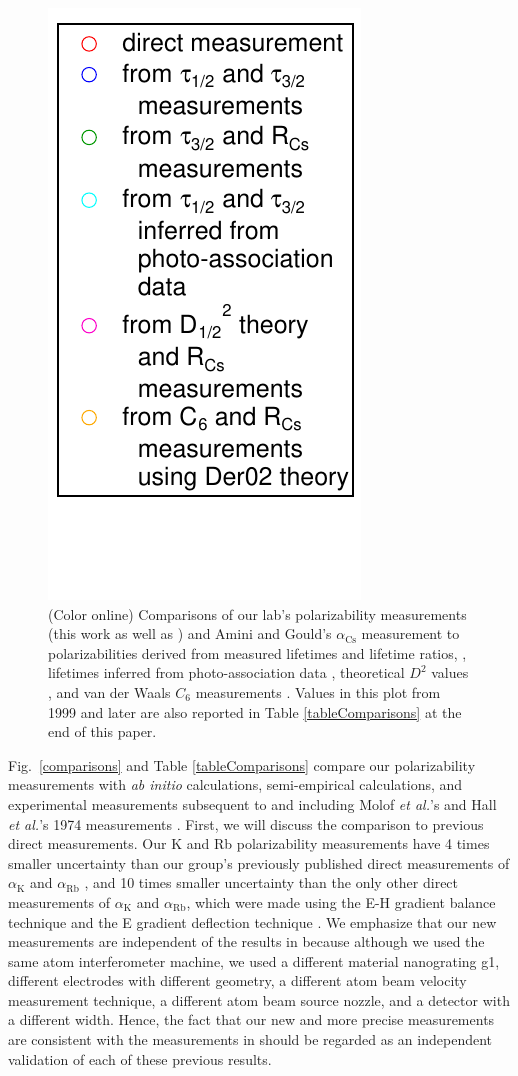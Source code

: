 \documentclass[twocolumn,pra,showpacs,superscriptaddress,longbibliography]{revtex4-1}   %
\newcommand{\figref}[1]{Fig.~\ref{#1}}
\newcommand{\ak}{\alpha_{\textrm{K}}}
\newcommand{\arb}{\alpha_{\textrm{Rb}}}
\newcommand{\acs}{\alpha_{\textrm{Cs}}}
\newcommand{\etal}{\textit{et al.}}
\begin{document}
\begin{figure}
\includegraphics[width=0.365\linewidth,keepaspectratio,valign=t]{displayMiscLegend.pdf}
\caption{\label{comparisonsMisc}(Color online) Comparisons of our lab's polarizability measurements (this work as well as \cite{Holmgren2010}) and Amini and Gould's $\acs$ measurement \cite{Amini2003} to polarizabilities derived from measured lifetimes and lifetime ratios,
\cite{Young1994,Volz2006,Wang1997,Simsarian1998,Rafac1999,Falke2006a,Bouloufa2007,Rafac1998}, 
lifetimes inferred from photo-association data
\cite{Gutterres2002,Gabbanini2000},
theoretical $D^2$ values
\cite{Porsev2010},
and van der Waals $C_6$ measurements
\cite{Leo2000,Chin2004,Derevianko2001}. Values in this plot from 1999 and later are also reported in Table \ref{tableComparisons} at the end of this paper.}
\end{figure}


\figref{comparisons} and Table \ref{tableComparisons} compare our polarizability measurements with \textit{ab initio} calculations, semi-empirical calculations, and experimental measurements subsequent to and including Molof \etal's and Hall \etal's 1974 measurements \cite{Molof1974a,Hall1974}.  First, we will discuss the comparison to previous direct measurements.   Our K and Rb polarizability measurements have 4 times smaller uncertainty than our group's previously published direct measurements of $\ak$ and $\arb$ \cite{Holmgren2010}, and 10 times smaller uncertainty than the only other direct measurements of $\ak$ and $\arb$, which were made using the E-H gradient balance technique \cite{Molof1974a} and the E gradient deflection technique  \cite{Hall1974}.  We emphasize that our new measurements are independent of the results in \cite{Holmgren2010} because although we used the same atom interferometer machine, we used a different material nanograting g1, different electrodes with different geometry, a different atom beam velocity measurement technique, a different atom beam source nozzle, and a detector with a different width. Hence, the fact that our new and more precise measurements are consistent with the measurements in \cite{Holmgren2010,Molof1974a,Hall1974} should be regarded as an independent validation of each of these previous results.
\end{document}

